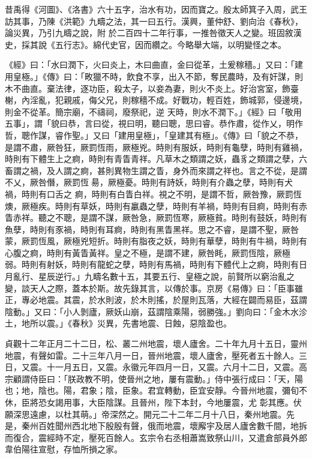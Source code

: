 
\begin{pinyinscope}

 昔禹得《河圖》、《洛書》六十五字，治水有功，因而寶之。殷太師箕子入周，武王訪其事，乃陳《洪範》九疇之法，其一曰五行。漢興，董仲舒、劉向治《春秋》，論災異，乃引九疇之說，附
 於二百四十二年行事，一推咎徵天人之變。班固敘漢史，採其說《五行志》。綿代史官，因而纘之。今略舉大端，以明變怪之本。



 《經》曰：「水曰潤下，火曰炎上，木曰曲直，金曰從革，土爰稼穡。」又曰：「建用皇極。」《傳》曰：「畋獵不時，飲食不享，出入不節，奪民農時，及有奸謀，則木不曲直。棄法律，逐功臣，殺太子，以妾為妻，則火不炎上。好治宮室，飾臺榭，內淫亂，犯親戚，侮父兄，則稼穡不成。好戰功，輕百姓，飾城郭，侵邊境，則金不從革。簡宗廟，不禱祠，廢祭祀，逆
 天時，則水不潤下。」《經》曰「敬用五事」，謂「貌曰恭，言曰從，視曰明，聽曰聰，思曰睿。恭作肅，從作乂，明作哲，聰作謀，睿作聖。」又曰「建用皇極」，「皇建其有極」。《傳》曰「貌之不恭，是謂不肅，厥咎狂，厥罰恆雨，厥極兇。時則有服妖，時則有龜孽，時則有雞禍，時則有下體生上之痾，時則有青眚青祥。凡草木之類謂之妖，蟲豸之類謂之孽，六畜謂之禍，及人謂之痾，甚則異物生謂之眚，身外而來謂之祥也。言之不從，是謂不乂，厥咎僭，厥罰恆昜，厥極憂。時則有詩妖，時則有介蟲之孽，時則有犬禍，時則有口舌之
 痾，時則有白眚白祥。視之不明，是謂不哲，厥咎豫，厥罰恆燠，厥極疾。時則有草妖，時則有臝蟲之孽，時則有羊禍，時則有目痾，時則有赤眚赤祥。聽之不聰，是謂不謀，厥咎急，厥罰恆寒，厥極貧。時則有鼓妖，時則有魚孽，時則有豕禍，時則有耳痾，時則有黑眚黑祥。思之不睿，是謂不聖，厥咎蒙，厥罰恆風，厥極兇短折。時則有脂夜之妖，時則有華孽，時則有牛禍，時則有心腹之痾，時則有黃眚黃祥。皇之不極，是謂不建，厥咎眊，厥罰恆陰，厥極
 弱。時則有射妖，時則有龍蛇之孽，時則有馬禍，時則有下體代上之痾，時則有日月亂行、星辰逆行。」九疇名數十五，其要五行、皇極之說，前賢所以窮治亂之變，談天人之際，蓋本於斯。故先錄其言，以傳於事。京房《易傳》曰：「臣事雖正，專必地震。其震，於水則波，於木則搖，於屋則瓦落，大經在闢而易臣，茲謂陰動。」又曰：「小人剝廬，厥妖山崩，茲謂陰乘陽，弱勝強。」劉向曰：「金木水沴土，地所以震。」《春秋》災異，先書地震、日蝕，惡陰盈也。



 貞觀十二年正月二十二日，松、叢二州地震，壞人廬舍。二十年九月十五日，靈州地震，有聲如雷。二十三年八月一日，晉州地震，壞人廬舍，壓死者五十餘人。三日，又震。十一月五日，又震。永徽元年四月一日，又震。六月十二日，又震。高宗顧謂侍臣曰：「朕政教不明，使晉州之地，屢有震動。」侍中張行成曰：「天，陽也；地，陰也。陽，君象；陰，臣象。君宜轉動，臣宜安靜。今晉州地震，彌旬不休，臣將恐女謁用事，大臣陰謀。且晉州，陛下本封，今地屢震，尤
 彰其應。伏願深思遠慮，以杜其萌。」帝深然之。開元二十二年二月十八日，秦州地震。先是，秦州百姓聞州西北地下殷殷有聲，俄而地震，壞廨宇及居人廬舍數千間，地拆而復合，震經時不定，壓死百餘人。玄宗令右丞相蕭嵩致祭山川，又遣倉部員外郎韋伯陽往宣慰，存恤所損之家。




\end{pinyinscope}
